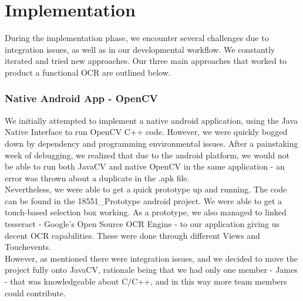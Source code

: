 \section{Implementation}
During the implementation phase, we encounter several challenges due to integration issues,
as well as in our developmental workflow. We constantly iterated and tried new approaches.
Our three main approaches that worked to product a functional OCR are outlined below.

\subsubsection{Native Android App - OpenCV}
We initially attempted to implement a native android application, using the Java Native Interface
to run OpenCV C++ code. However, we were quickly bogged down by dependency and programming environmental
issues. After a painstaking week of debugging, we realized that due to the android platform, we would
not be able to run both JavaCV and native OpenCV in the same application - an error was thrown about
a duplicate in the .apk file. \\
Nevertheless, we were able to get a quick prototype up and running.
The code can be found in the 18551\_Prototype android project. We were able to get a touch-based
selection box working. As a prototype, we also managed to linked tesseract - Google's Open Source OCR Engine - 
to our application giving us decent OCR capabilities. These were done through different Views and Touchevents.\\

However, as mentioned there were integration issues,
and we decided to move the project fully onto JavaCV, rationale being that we had only one member - James - 
that was knowledgeable about C/C++, and in this way more team members could contribute.


